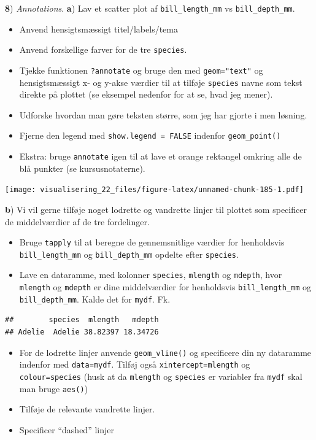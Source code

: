 \documentclass[
]{book}
\providecommand{\tightlist}{%
  \setlength{\itemsep}{0pt}\setlength{\parskip}{0pt}}
\begin{document}
\textbf{8}) \emph{Annotations}. \textbf{a}) Lav et scatter plot af \texttt{bill\_length\_mm} vs \texttt{bill\_depth\_mm}.

\begin{itemize}
\tightlist
\item
  Anvend hensigtsmæssigt titel/labels/tema
\item
  Anvend forskellige farver for de tre \texttt{species}.
\item
  Tjekke funktionen \texttt{?annotate} og bruge den med \texttt{geom="text"} og hensigtsmæssigt x- og y-akse værdier til at tilføje \texttt{species} navne som tekst direkte på plottet (se eksempel nedenfor for at se, hvad jeg mener).
\item
  Udforske hvordan man gøre teksten større, som jeg har gjorte i men løsning.
\item
  Fjerne den legend med \texttt{show.legend\ =\ FALSE} indenfor \texttt{geom\_point()}
\item
  Ekstra: bruge \texttt{annotate} igen til at lave et orange rektangel omkring alle de blå punkter (se kursusnotaterne).
\end{itemize}

\texttt{[image: visualisering\_22\_files/figure-latex/unnamed-chunk-185-1.pdf]}

\textbf{b}) Vi vil gerne tilføje noget lodrette og vandrette linjer til plottet som specificer de middelværdier af de tre fordelinger.

\begin{itemize}
\tightlist
\item
  Bruge \texttt{tapply} til at beregne de gennemsnitlige værdier for henholdsvis \texttt{bill\_length\_mm} og \texttt{bill\_depth\_mm} opdelte efter \texttt{species}.
\item
  Lave en dataramme, med kolonner \texttt{species}, \texttt{mlength} og \texttt{mdepth}, hvor \texttt{mlength} og \texttt{mdepth} er dine middelværdier for henholdsvis \texttt{bill\_length\_mm} og \texttt{bill\_depth\_mm}. Kalde det for \texttt{mydf}. Fk.
\end{itemize}

\begin{verbatim}
##        species  mlength   mdepth
## Adelie  Adelie 38.82397 18.34726
\end{verbatim}

\begin{itemize}
\tightlist
\item
  For de lodrette linjer anvende \texttt{geom\_vline()} og specificere din ny dataramme indenfor med \texttt{data=mydf}. Tilføj også \texttt{xintercept=mlength} og \texttt{colour=species} (husk at da \texttt{mlength} og \texttt{species} er variabler fra \texttt{mydf} skal man bruge \texttt{aes()})\\
\item
  Tilføje de relevante vandrette linjer.
\item
  Specificer ``dashed'' linjer
\end{itemize}
\end{document}
